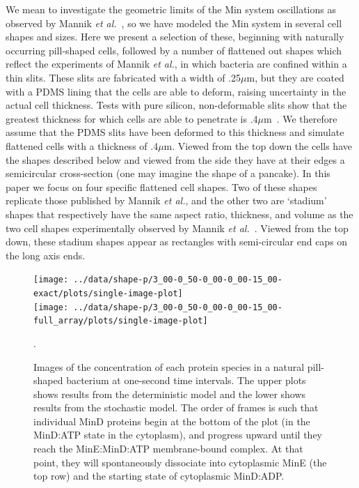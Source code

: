 \documentclass[10pt,letterpaper]{article}
\newcommand\micron{\ensuremath{\mu\text{m}}}
\begin{document}
We mean to investigate the geometric limits of the Min system
oscillations as observed by Mannik \emph{et
  al.}~\cite{mannik2012robustness}, so we have modeled the Min system
in several cell shapes and sizes.  Here we present a selection of
these, beginning with naturally occurring pill-shaped cells, followed
by a number of flattened out shapes which reflect the experiments of
Mannik \emph{et al.}, in which bacteria are confined within a thin
slits.  These slits are fabricated with a width of .25\micron, but
they are coated with a PDMS lining that the cells are able to deform,
raising uncertainty in the actual cell thickness.  Tests with pure
silicon, non-deformable slits show that the greatest thickness for
which cells are able to penetrate is
.4\micron~\cite{mannik2012robustness,mannik2009bacterial}.  We
therefore assume that the PDMS slits have been deformed to this
thickness and simulate flattened cells with a thickness of .4\micron.
Viewed from the top down the cells have the shapes described below and
viewed from the side they have at their edges a semicircular
cross-section (one may imagine the shape of a pancake).
%
In this paper we focus on four specific flattened cell shapes.  Two of
these shapes replicate those published by Mannik \emph{et al.}, and
the other two are `stadium' shapes that respectively have the same
aspect ratio, thickness, and volume as the two cell shapes
experimentally observed by Mannik \emph{et
  al.}~\cite{mannik2012robustness}.  Viewed from the top down, these
stadium shapes appear as rectangles with semi-circular end caps on the
long axis ends.

\begin{figure}
  \begin{center}
    \hspace{-3.5cm}
    \texttt{[image: ../data/shape-p/3\_00-0\_50-0\_00-0\_00-15\_00-exact/plots/single-image-plot]}\\
    \vspace{-1.5em}
    \hspace{-3.5cm}
    \texttt{[image: ../data/shape-p/3\_00-0\_50-0\_00-0\_00-15\_00-full\_array/plots/single-image-plot]}
    \vspace{-1.5em}
  \end{center}
  \caption{Images of the concentration of each protein species in a
    natural pill-shaped bacterium at one-second time intervals. The
    upper plots shows results from the deterministic model and the
    lower shows results from the stochastic model.  The order of
    frames is such that individual MinD proteins begin at the bottom
    of the plot (in the MinD:ATP state in the cytoplasm), and progress
    upward until they reach the MinE:MinD:ATP membrane-bound complex.
    At that point, they will spontaneously dissociate into cytoplasmic
    MinE (the top row) and the starting state of cytoplasmic
    MinD:ADP.}.
  \label{image-p}
\end{figure}
\end{document}
